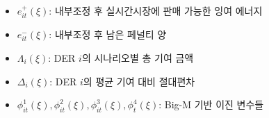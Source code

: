 \documentclass[xcolor=dvipsnames,t,9pt]{beamer}
\begin{document}
{\begin{frame}[noframenumbering]
\begin{minipage}[t]{0.58\textwidth}
\begin{itemize}
            \item $e^+_{it}(\xi)$: 내부조정 후 실시간시장에 판매 가능한 잉여 에너지
            \item $e^-_{it}(\xi)$: 내부조정 후 남은 페널티 양
            \item $\Lambda_i(\xi)$: DER $i$의 시나리오별 총 기여 금액
            \item $\Delta_i(\xi)$: DER $i$의 평균 기여 대비 절대편차
            \item $\phi^1_{it}(\xi), \phi^2_{it}(\xi), \phi^3_{it}(\xi), \phi^4_{t}(\xi)$: Big-M 기반 이진 변수들
        \end{itemize}
    \end{minipage}
\end{frame}
}

\end{document}
